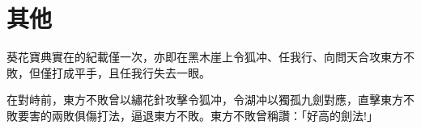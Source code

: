 \section{其他}

葵花寶典實在的紀載僅一次，亦即在黑木崖上令狐冲、任我行、向問天合攻東方不敗，但僅打成平手，且任我行失去一眼。

在對峙前，東方不敗曾以繡花針攻擊令狐冲，令湖冲以獨孤九劍對應，直擊東方不敗要害的兩敗俱傷打法，逼退東方不敗。東方不敗曾稱讚：「好高的劍法!」

